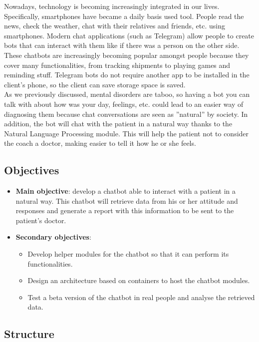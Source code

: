 \documentclass[12pt,english]{article}
\begin{document}
Nowadays, technology is becoming increasingly integrated in our lives. Specifically, smartphones have became a daily basis used tool. People read the news, check the weather, chat with their relatives and friends, etc. using smartphones. Modern chat applications (such as Telegram) allow people to create bots that can interact with them like if there was a person on the other side. These chatbots are increasingly becoming popular amongst people because they cover many functionalities, from tracking shipments to playing games and reminding stuff. Telegram bots do not require another app to be installed in the client's phone, so the client can save storage space is saved.\\

As we previously discussed, mental disorders are taboo, so having a bot you can talk with about how was your day, feelings, etc. could lead to an easier way of diagnosing them because chat conversations are seen as ''natural'' by society. In addition, the bot will chat with the patient in a natural way thanks to the Natural Language Processing module. This will help the patient not to consider the coach a doctor, making easier to tell it how he or she feels.

\newpage

\subsection{Objectives}

\begin{itemize}
  \item \textbf{Main objective}: develop a chatbot able to interact with a patient in a natural way. This chatbot will retrieve data from his or her attitude and responses and generate a report with this information to be sent to the patient's doctor.
  \item \textbf{Secondary objectives}:
    \begin{itemize}
      \item Develop helper modules for the chatbot so that it can perform its functionalities.
      \item Design an architecture based on containers to host the chatbot modules.
      \item Test a beta version of the chatbot in real people and analyse the retrieved data.
    \end{itemize}
\end{itemize}

\subsection{Structure}
\end{document}
